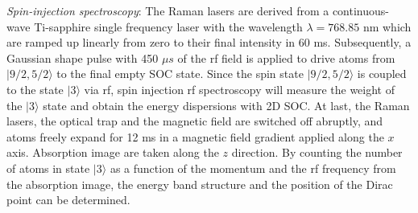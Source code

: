 \documentclass[aps,prl,twocolumn,floatfix,reprint]{revtex4}
\begin{document}
\emph{Spin-injection spectroscopy}: The Raman lasers are derived from a
continuous-wave Ti-sapphire single frequency laser with the wavelength $%
\lambda =768.85$ nm which are ramped up linearly from zero to their final
intensity in 60 ms. Subsequently, a Gaussian shape pulse with 450 $\mu s$ of
the rf field is applied to drive atoms from $|9/2,5/2\rangle $ to the final
empty SOC state. Since the spin state $|9/2,5/2\rangle $ is coupled to the
state $|3\rangle $ via rf, spin injection rf spectroscopy will measure the
weight of the $|3\rangle $ state and obtain the energy dispersions with 2D
SOC. At last, the Raman lasers, the optical trap and the magnetic field are
switched off abruptly, and atoms freely expand for 12 ms in a magnetic field
gradient applied along the $x$ axis. Absorption image are taken along the $z$
direction. By counting the number of atoms in state $|3\rangle $ as a
function of the momentum and the rf frequency from the absorption image, the
energy band structure and the position of the Dirac point can be determined.
\end{document}
